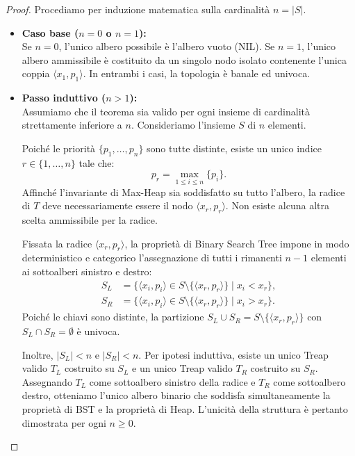 \begin{proof}
Procediamo per induzione matematica sulla cardinalit\`a $n = |S|$.
\begin{itemize}
    \item \textbf{Caso base ($n = 0$ o $n = 1$):}\\
    Se $n = 0$, l'unico albero possibile \`e l'albero vuoto (NIL). Se $n = 1$, l'unico albero ammissibile \`e costituito da un singolo nodo isolato contenente l'unica coppia $\langle x_1, p_1 \rangle$. In entrambi i casi, la topologia \`e banale ed univoca.

    \item \textbf{Passo induttivo ($n > 1$):}\\
    Assumiamo che il teorema sia valido per ogni insieme di cardinalit\`a strettamente inferiore a $n$. Consideriamo l'insieme $S$ di $n$ elementi.
    
    Poich\'e le priorit\`a $\{p_1, \dots, p_n\}$ sono tutte distinte, esiste un unico indice $r \in \{1, \dots, n\}$ tale che:
    \begin{equation}
      p_r = \max_{1 \le i \le n} \{ p_i \}.
    \end{equation}
    Affinch\'e l'invariante di Max-Heap sia soddisfatto su tutto l'albero, la radice di $T$ deve necessariamente essere il nodo $\langle x_r, p_r \rangle$. Non esiste alcuna altra scelta ammissibile per la radice.

    Fissata la radice $\langle x_r, p_r \rangle$, la propriet\`a di Binary Search Tree impone in modo deterministico e categorico l'assegnazione di tutti i rimanenti $n - 1$ elementi ai sottoalberi sinistro e destro:
    \begin{align}
      S_L &= \{ \langle x_i, p_i \rangle \in S \setminus \{\langle x_r, p_r \rangle\} \mid x_i < x_r \}, \\
      S_R &= \{ \langle x_i, p_i \rangle \in S \setminus \{\langle x_r, p_r \rangle\} \mid x_i > x_r \}.
    \end{align}
    Poich\'e le chiavi sono distinte, la partizione $S_L \cup S_R = S \setminus \{\langle x_r, p_r \rangle\}$ con $S_L \cap S_R = \emptyset$ \`e univoca.
    
    Inoltre, $|S_L| < n$ e $|S_R| < n$. Per ipotesi induttiva, esiste un unico Treap valido $T_L$ costruito su $S_L$ e un unico Treap valido $T_R$ costruito su $S_R$. Assegnando $T_L$ come sottoalbero sinistro della radice e $T_R$ come sottoalbero destro, otteniamo l'unico albero binario che soddisfa simultaneamente la propriet\`a di BST e la propriet\`a di Heap. L'unicit\`a della struttura \`e pertanto dimostrata per ogni $n \ge 0$.
\end{itemize}
\end{proof}

